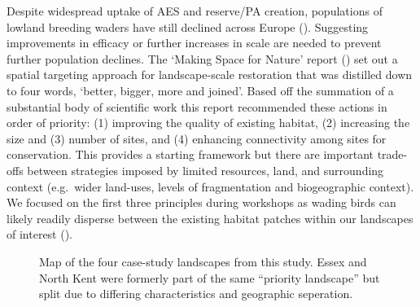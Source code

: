 \documentclass[
  12pt,
  letterpaper,
  DIV=11,
  numbers=noendperiod]{scrartcl}
\begin{document}
Despite widespread uptake of AES and reserve/PA creation, populations of
lowland breeding waders have still declined across Europe
(). Suggesting improvements
in efficacy or further increases in scale are needed to prevent further
population declines. The `Making Space for Nature' report
() set out a spatial
targeting approach for landscape-scale restoration that was distilled
down to four words, `better, bigger, more and joined'. Based off the
summation of a substantial body of scientific work this report
recommended these actions in order of priority: (1) improving the
quality of existing habitat, (2) increasing the size and (3) number of
sites, and (4) enhancing connectivity among sites for conservation. This
provides a starting framework but there are important trade-offs between
strategies imposed by limited resources, land, and surrounding context
(e.g.~wider land-uses, levels of fragmentation and biogeographic
context). We focused on the first three principles during workshops as
wading birds can likely readily disperse between the existing habitat
patches within our landscapes of interest
().

\begin{figure}[H]


\caption{\label{fig-landscapes}Map of the four case-study landscapes
from this study. Essex and North Kent were formerly part of the same
``priority landscape'' but split due to differing characteristics and
geographic seperation.}

\end{figure}%
\end{document}
